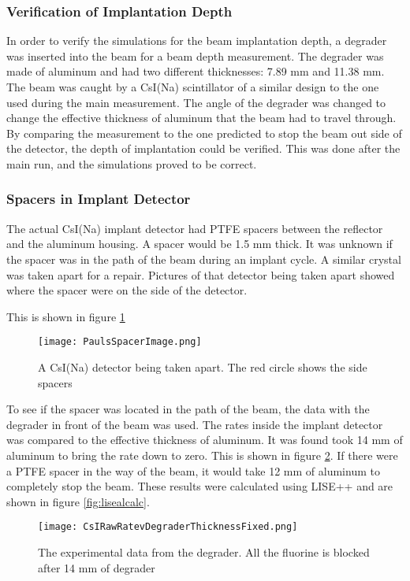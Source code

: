 \documentclass[../MaxHughesThesis.tex]{subfiles}
\begin{document}
\subsubsection{Verification of Implantation Depth}

In order to verify the simulations for the beam implantation depth, a degrader was inserted into the beam for a beam depth measurement.
The degrader was made of aluminum and had two different thicknesses: 7.89 mm and 11.38 mm. 
The beam was caught by a CsI(Na) scintillator of a similar design to the one used during the main measurement.
The angle of the degrader was changed to change the effective thickness of aluminum that the beam had to travel through. 
By comparing the measurement to the one predicted to stop the beam out side of the detector, the depth of implantation could be verified. 
This was done after the main run, and the simulations proved to be correct.

\subsubsection{Spacers in Implant Detector}
The actual CsI(Na) implant detector had PTFE spacers between the reflector and the aluminum housing.
A spacer would be 1.5 mm thick. 
It was unknown if the spacer was in the path of the beam during an implant cycle. 
A similar crystal was taken apart for a repair. 
Pictures of that detector being taken apart showed where the spacer were on the side of the detector. 

This is shown in figure \ref{fig:detpic}

\begin{figure}[!htb]
	\centerline{\texttt{[image: PaulsSpacerImage.png]}}
	\caption{A CsI(Na) detector being taken apart.
		 The red circle shows the side spacers}
	\label{fig:detpic}
\end{figure}

To see if the spacer was located in the path of the beam, the data with the degrader in front of the beam was used.
The rates inside the implant detector was compared to the effective thickness of aluminum. 
It was found took 14 mm of aluminum to bring the rate down to zero.
This is shown in figure \ref{fig:degraderdata}.
If there were a PTFE spacer in the way of the beam, it would take 12 mm of aluminum to completely stop the beam.
These results were calculated using LISE++ and are shown in figure \ref{fig:lisealcalc}.

\begin{figure}[!htb]
	\centerline{\texttt{[image: CsIRawRatevDegraderThicknessFixed.png]}}
	\caption{The experimental data from the degrader. 
		 All the fluorine is blocked after 14 mm of degrader}
	\label{fig:degraderdata}
\end{figure}
\end{document}
